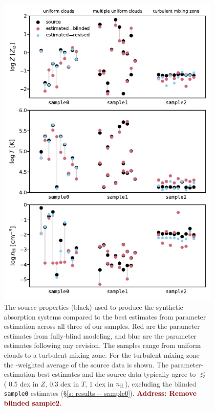\documentclass[fleqn,usenatbib]{mnras}
\newcommand{\todo}[1]{\textcolor{Maroon}{\textbf{Address: #1}}}
\begin{document}
\begin{figure}
    \centering
    \includegraphics[width=\columnwidth]{figures/averages.pdf}
    \caption{
    The source properties (black) used to produce the synthetic absorption systems
    compared to the best estimates from parameter estimation across all three of our samples.
    Red are the parameter estimates from fully-blind modeling,
    and blue are the parameter estimates following any revision.
    The samples range from uniform clouds to a turbulent mixing zone.
    For the turbulent mixing zone the -weighted average of the source data is shown.
    The parameter-estimation best estimates and the source data typically agree to $\lesssim$ ( 0.5 dex in $Z$, 0.3 dex in $T$, 1 dex in $n_{\rm H}$),
    excluding the blinded \texttt{sample0} estimates (\S\ref{s: results -- sample0}).
    \todo{Remove blinded sample2.}
    }
    \label{f: summary--average}
\end{figure}
\end{document}
